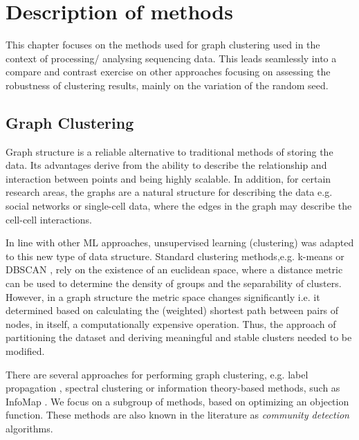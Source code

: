 \chapter{Description of methods}

This chapter focuses on the methods used for graph clustering used in the context of processing/ analysing sequencing data. This leads seamlessly into a compare and contrast exercise on other approaches focusing on assessing the robustness of clustering results, mainly on the variation of the random seed.

\section{Graph Clustering}
Graph structure is a reliable alternative to traditional methods of storing the data. Its advantages derive from the ability to describe the relationship and interaction between points and being highly scalable. In addition, for certain research areas, the graphs are a natural structure for describing the data e.g. social networks or single-cell data, where the edges in the graph may describe the cell-cell interactions.

In line with other ML approaches, unsupervised learning (clustering) was adapted to this new type of data structure. Standard clustering methods,e.g. k-means \cite{Lloyd1982} or DBSCAN \cite{ester1996}, rely on the existence of an euclidean space, where a distance metric can be used to determine the density of groups and the separability of clusters. However, in a graph structure the metric space changes significantly i.e. it determined based on calculating the (weighted) shortest path between pairs of nodes, in itself, a computationally expensive operation. Thus, the approach of partitioning the dataset and deriving meaningful and stable clusters needed to be modified.

There are several approaches for performing graph clustering, e.g. label propagation \cite{Raghavan2007}, spectral clustering \cite{alpert1995spectral} or information theory-based methods, such as InfoMap \cite{Rosvall2009}. We focus on a subgroup of methods, based on optimizing an objection function. These methods are also known in the literature as \textit{community detection} algorithms.

